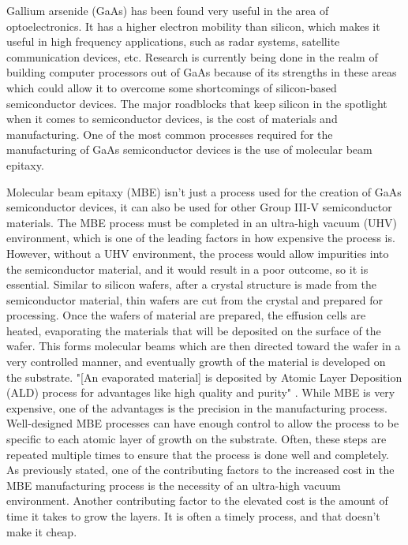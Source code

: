 \documentclass[12pt]{article}
\begin{document}
\begin{flushleft}
Gallium arsenide (GaAs) has been found very useful
in the area of optoelectronics. It has a higher electron
mobility than silicon, which makes it useful in high
frequency applications, such as radar systems, satellite
communication devices, etc. Research is currently being
done in the realm of building computer processors out
of GaAs because of its strengths in these areas which
could allow it to overcome some shortcomings of silicon-based
semiconductor devices. The major roadblocks that keep
silicon in the spotlight when it comes to semiconductor
devices, is the cost of materials and manufacturing.
One of the most common processes required for the manufacturing
of GaAs semiconductor devices is the use of molecular
beam epitaxy.

Molecular beam epitaxy (MBE) isn't just a process used
for the creation of GaAs semiconductor devices, it
can also be used for other Group III-V semiconductor
materials. The MBE process must be completed in an
ultra-high vacuum (UHV) environment, which is one of
the leading factors in how expensive the process is.
However, without a UHV environment, the process would
allow impurities into the semiconductor material, and
it would result in a poor outcome, so it is essential.
Similar to silicon wafers, after a crystal structure
is made from the semiconductor material, thin wafers
are cut from the crystal and prepared for processing.
Once the wafers of material are prepared, the effusion
cells are heated, evaporating the materials that will
be deposited on the surface of the wafer. This forms
molecular beams which are then directed toward the
wafer in a very controlled manner, and eventually growth
of the material is developed on the substrate. "[An
evaporated material] is deposited by Atomic Layer Deposition
(ALD) process for advantages like high quality and
purity" \parencite{MBE}. While MBE is very expensive,
one of the advantages is the precision in the manufacturing
process. Well-designed MBE processes can have enough
control to allow the process to be specific to each
atomic layer of growth on the substrate. Often, these
steps are repeated multiple times to ensure that the
process is done well and completely. As previously
stated, one of the contributing factors to the increased
cost in the MBE manufacturing process is the necessity
of an ultra-high vacuum environment. Another contributing
factor to the elevated cost is the amount of time it
takes to grow the layers. It is often a timely process,
and that doesn't make it cheap.


\end{flushleft}
\end{document}
